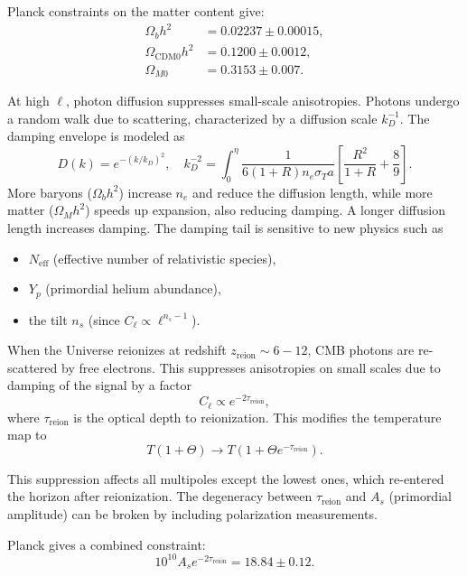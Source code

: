 \documentclass{aa}
\numberwithin{equation}{section}
\numberwithin{table}{section}
\numberwithin{figure}{section}
\begin{document}
Planck constraints on the matter content give:
\begin{align*}
\Omega_b h^2 &= 0.02237 \pm 0.00015, \\
\Omega_\text{CDM0} h^2 &= 0.1200 \pm 0.0012, \\
\Omega_{M0} &= 0.3153 \pm 0.007.
\end{align*}

At high $\ell$, photon diffusion suppresses small-scale anisotropies. Photons undergo a random walk due to scattering, characterized by a diffusion scale $k_D^{-1}$. The damping envelope is modeled as
\begin{equation}
D(k) = e^{-(k/k_D)^2}, \quad k_D^{-2} = \int_0^\eta \frac{1}{6(1+R)n_e \sigma_T a} \left[\frac{R^2}{1 + R} + \frac{8}{9}\right].
\end{equation}
More baryons ($\Omega_b h^2$) increase $n_e$ and reduce the diffusion length, while more matter ($\Omega_M h^2$) speeds up expansion, also reducing damping. A longer diffusion length increases damping. The damping tail is sensitive to new physics such as
\begin{itemize}
    \item $N_\text{eff}$ (effective number of relativistic species),
    \item $Y_p$ (primordial helium abundance),
    \item the tilt $n_s$ (since $C_\ell \propto \ell^{n_s - 1}$).
\end{itemize}

When the Universe reionizes at redshift $z_\text{reion} \sim 6 - 12$, CMB photons are re-scattered by free electrons. This suppresses anisotropies on small scales due to damping of the signal by a factor
\begin{equation}
C_\ell \propto e^{-2\tau_\text{reion}},
\end{equation}
where $\tau_\text{reion}$ is the optical depth to reionization. This modifies the temperature map to
\begin{equation}
T(1 + \Theta) \to T(1 + \Theta e^{-\tau_\text{reion}}).
\end{equation}

This suppression affects all multipoles except the lowest ones, which re-entered the horizon after reionization. The degeneracy between $\tau_\text{reion}$ and $A_s$ (primordial amplitude) can be broken by including polarization measurements.

Planck gives a combined constraint:
\begin{equation}
10^{10} A_s e^{-2\tau_\text{reion}} = 18.84 \pm 0.12.
\end{equation}
\end{document}
